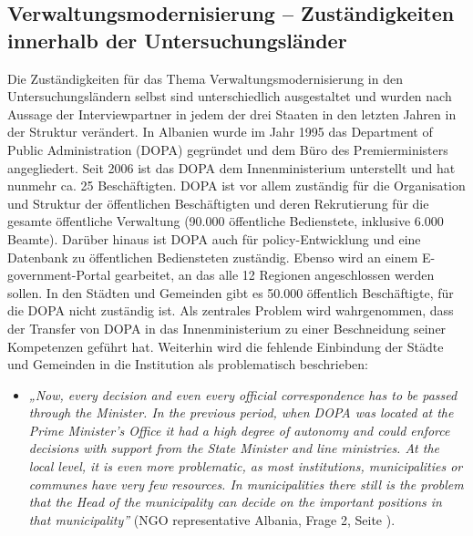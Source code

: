 \subsection{Verwaltungsmodernisierung – Zuständigkeiten innerhalb der Untersuchungsländer }
Die Zuständigkeiten für das Thema Verwaltungsmodernisierung in den Untersuchungsländern selbst sind unterschiedlich ausgestaltet und wurden nach Aussage der Interviewpartner in jedem der drei Staaten in den letzten Jahren in der Struktur verändert. In Albanien wurde im Jahr 1995 das Department of Public Administration (DOPA) gegründet und dem Büro des Premierministers angegliedert. Seit 2006 ist das DOPA dem Innenministerium unterstellt und hat nunmehr ca. 25 Beschäftigten. DOPA ist vor allem zuständig für die Organisation und Struktur der öffentlichen Beschäftigten und deren Rekrutierung für die gesamte öffentliche Verwaltung (90.000 öffentliche Bedienstete, inklusive 6.000 Beamte). Darüber hinaus ist DOPA auch für policy-Entwicklung und eine Datenbank zu öffentlichen Bediensteten zuständig. Ebenso wird an einem E-government-Portal gearbeitet, an das alle 12 Regionen angeschlossen werden sollen. In den Städten und Gemeinden gibt es 50.000 öffentlich Beschäftigte, für die DOPA nicht zuständig ist. Als zentrales Problem wird wahrgenommen, dass der Transfer von DOPA in das Innenministerium zu einer Beschneidung seiner Kompetenzen geführt hat. Weiterhin wird die fehlende Einbindung der Städte und Gemeinden in die Institution als problematisch beschrieben:
\begin{itemize}[label={}]
\item \textit{„Now, every decision and even every official correspondence has to be passed through the Minister. In the previous period, when DOPA was located at the Prime Minister’s Office it had a high degree of autonomy and could enforce decisions with support from the State Minister and line ministries. At the local level, it is even more problematic, as most institutions, municipalities or communes have very few resources. In municipalities there still is the problem that the Head of the municipality can decide on the important positions in that municipality”} (NGO representative Albania, Frage 2, Seite \pageref{sec:par ahead}).
\end{itemize}

